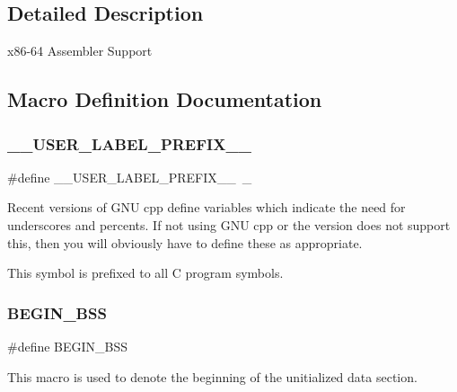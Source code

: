 \subsection{Detailed Description}
x86-\/64 Assembler Support 



\subsection{Macro Definition Documentation}
\mbox{\label{group__RTEMSScoreCPUx86-64ASM_gaff6bf0ff0fa3b5cbd23a8ae1131c87a9}} 
\subsubsection{\texorpdfstring{\_\_USER\_LABEL\_PREFIX\_\_}{\_\_USER\_LABEL\_PREFIX\_\_}}
{\footnotesize\ttfamily \#define \+\_\+\+\_\+\+U\+S\+E\+R\+\_\+\+L\+A\+B\+E\+L\+\_\+\+P\+R\+E\+F\+I\+X\+\_\+\+\_\+~\+\_\+}

Recent versions of G\+NU cpp define variables which indicate the need for underscores and percents. If not using G\+NU cpp or the version does not support this, then you will obviously have to define these as appropriate.

This symbol is prefixed to all C program symbols. \mbox{\label{group__RTEMSScoreCPUx86-64ASM_ga50f110f0489e48ceda4a0473a35d2978}} 
\subsubsection{\texorpdfstring{BEGIN\_BSS}{BEGIN\_BSS}}
{\footnotesize\ttfamily \#define B\+E\+G\+I\+N\+\_\+\+B\+SS}

This macro is used to denote the beginning of the unitialized data section. \mbox{\label{group__RTEMSScoreCPUx86-64ASM_ga6d6dc213aff5b736968e2aff37eb2c99}} 
